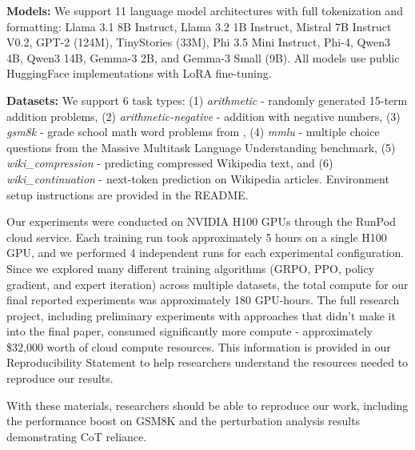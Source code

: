 \documentclass{article}
\begin{document}
\textbf{Models:} We support 11 language model architectures with full tokenization and formatting: Llama 3.1 8B Instruct, Llama 3.2 1B Instruct, Mistral 7B Instruct V0.2, GPT-2 (124M), TinyStories (33M), Phi 3.5 Mini Instruct, Phi-4, Qwen3 4B, Qwen3 14B, Gemma-3 2B, and Gemma-3 Small (9B). All models use public HuggingFace implementations with LoRA fine-tuning.

\textbf{Datasets:} We support 6 task types: (1) \textit{arithmetic} - randomly generated 15-term addition problems, (2) \textit{arithmetic-negative} - addition with negative numbers, (3) \textit{gsm8k} - grade school math word problems from \citet{cobbe2021gsm8k}, (4) \textit{mmlu} - multiple choice questions from the Massive Multitask Language Understanding benchmark, (5) \textit{wiki\_compression} - predicting compressed Wikipedia text, and (6) \textit{wiki\_continuation} - next-token prediction on Wikipedia articles. Environment setup instructions are provided in the README. 

Our experiments were conducted on NVIDIA H100 GPUs through the RunPod cloud service. Each training run took approximately 5 hours on a single H100 GPU, and we performed 4 independent runs for each experimental configuration. Since we explored many different training algorithms (GRPO, PPO, policy gradient, and expert iteration) across multiple datasets, the total compute for our final reported experiments was approximately 180 GPU-hours. The full research project, including preliminary experiments with approaches that didn't make it into the final paper, consumed significantly more compute - approximately \$32,000 worth of cloud compute resources. This information is provided in our Reproducibility Statement to help researchers understand the resources needed to reproduce our results.

With these materials, researchers should be able to reproduce our work, including the performance boost on GSM8K and the perturbation analysis results demonstrating CoT reliance.



\end{document}
